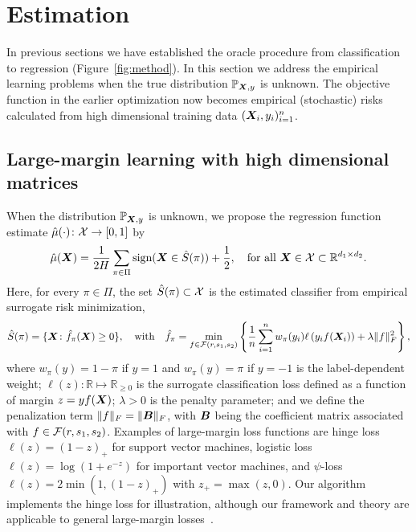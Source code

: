 \documentclass[11pt]{article}
\theoremstyle{plain}
\theoremstyle{definition}
\def\sign{\textup{sign}}
\begin{document}
\section{Estimation}\label{sec:estimation}
In previous sections we have established the oracle procedure from classification to regression (Figure~\ref{fig:method}). In this section we address the empirical learning problems when the true distribution $\mathbb{P}_{\bm X,y}$ is unknown. The objective function in the earlier optimization now becomes empirical (stochastic) risks calculated from high dimensional training data $(\bm X_i,y_i)_{i=1}^n$. 

\subsection{Large-margin learning with high dimensional matrices}
When the distribution $\mathbb{P}_{\bm X,y}$ is unknown, we propose the regression function estimate $\hat \mu(\cdot)\colon \mathcal{X} \to [0,1]$ by
\begin{equation}\label{eq:stepfunctionsample}
\hat \mu(\mX)= {1\over 2H}  \sum_{\pi \in \Pi} \sign (\mX\in \hat S(\pi))+{1\over 2},\quad \text{for all }\mX\in\tX\subset\mathbb{R}^{d_1\times d_2}.
\end{equation}
Here, for every $\pi\in\Pi$, the set $\hat S(\pi)\subset \mathcal{X}$ is the estimated classifier from empirical surrogate risk minimization,
\begin{align}\label{eq:large-margin}
\hat S(\pi) = \{\bm X \colon \hat f_\pi(\bm X) \geq 0\}, \quad \text{with}\quad \hat f_\pi=\min_{f\in\mathcal{F}(r,s_1,s_2)}\left\{ {1\over n}\sum_{i=1}^n w_{\pi}(y_i)\ell\left(y_if(\bm X_i)\right)+ \lambda \lVert f\rVert_F^2\right\},
\end{align}
where $w_\pi(y) = 1-\pi $ if $y = 1$ and $w_\pi(y)=\pi$ if $y = -1$ is the label-dependent weight; $\ell(z)\colon \mathbb{R}\mapsto \mathbb{R}_{\geq 0}$ is the surrogate classification loss defined as a function of margin $z=yf(\bm X)$; $\lambda>0$ is the penalty parameter; and we define the penalization term $\lVert f\rVert_F=\lVert\bm B\rVert_F$, with $\bm B$ being the coefficient matrix associated with $f\in\mathcal{F}(r,s_1,s_2)$. Examples of large-margin loss functions are hinge loss $\ell(z) = (1-z)_+$ for support vector machines, logistic loss $\ell(z) =\log(1+e^{-z})$ for important vector machines, and $\psi$-loss $\ell(z)=2\min(1,(1-z)_+)$ with $z_{+}=\max(z,0)$. Our algorithm implements the hinge loss for illustration, although our framework and theory are applicable to general large-margin losses~\citep{bartlett2006convexity}. 
\end{document}
